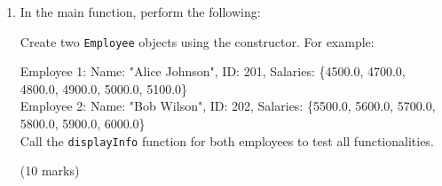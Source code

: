 \documentclass[a4paper,12pt]{article}
\begin{document}
\begin{enumerate}
    \newpage

    \item In the main function, perform the following:

    Create two \verb|Employee| objects using the constructor. For example:
    
    Employee 1: Name: "Alice Johnson", ID: 201, Salaries: \{4500.0, 4700.0, 4800.0, 4900.0, 5000.0, 5100.0\}\\
    Employee 2: Name: "Bob Wilson", ID: 202, Salaries: \{5500.0, 5600.0, 5700.0, 5800.0, 5900.0, 6000.0\}\\

    Call the \verb|displayInfo| function for both employees to test all functionalities.

    (10 marks)
\end{enumerate}
\vfill
\end{document}
